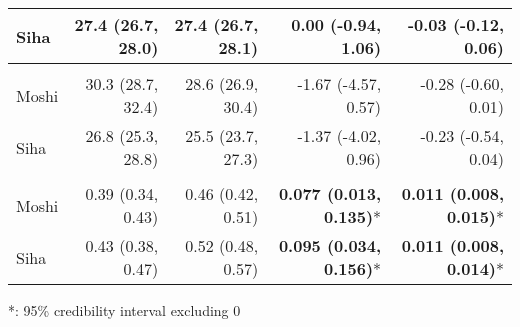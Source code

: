 \begin{table}[t]
\begin{tabular*}{\linewidth}{@{\extracolsep{\fill}}l|rrrr}
Siha & 27.4 (26.7, 28.0) & 27.4 (26.7, 28.1) & 0.00 (-0.94, 1.06) & -0.03 (-0.12, 0.06) \\ 
\midrule\addlinespace[2.5pt]
\multicolumn{5}{l}{UTCI} \\[2.5pt] 
\midrule\addlinespace[2.5pt]
Moshi & 30.3 (28.7, 32.4) & 28.6 (26.9, 30.4) & -1.67 (-4.57, 0.57) & -0.28 (-0.60, 0.01) \\ 
Siha & 26.8 (25.3, 28.8) & 25.5 (23.7, 27.3) & -1.37 (-4.02, 0.96) & -0.23 (-0.54, 0.04) \\ 
\midrule\addlinespace[2.5pt]
\multicolumn{5}{l}{Greenness (NDVI)} \\[2.5pt] 
\midrule\addlinespace[2.5pt]
Moshi & 0.39 (0.34, 0.43) & 0.46 (0.42, 0.51) & \textbf{0.077 (0.013, 0.135)}* & \textbf{0.011 (0.008, 0.015)}* \\ 
Siha & 0.43 (0.38, 0.47) & 0.52 (0.48, 0.57) & \textbf{0.095 (0.034, 0.156)}* & \textbf{0.011 (0.008, 0.014)}* \\ 
\bottomrule
\end{tabular*}
\begin{minipage}{\linewidth}
*: 95\% credibility interval excluding 0\\
\end{minipage}
\end{table}

